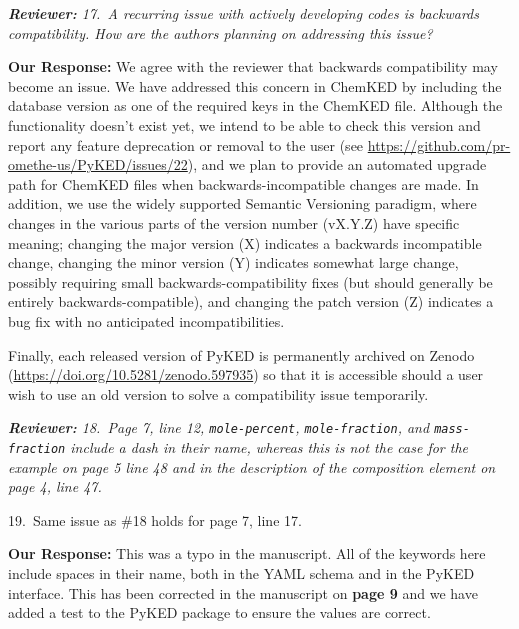 \documentclass[a4paper,10pt]{elsarticle}
\newenvironment{reviewer}{\vspace{0.5\baselineskip}\begingroup\itshape\textbf{Reviewer:}}{\endgroup}
\newenvironment{response}{\textbf{Our Response:}}{\vspace{0.5\baselineskip}}
\begin{document}
\begin{reviewer}
    17.~A recurring issue with actively developing codes is backwards compatibility. How are the
    authors planning on addressing this issue?
\end{reviewer}

\begin{response}
    We agree with the reviewer that backwards compatibility may become an issue. We have addressed
    this concern in ChemKED by including the database version as one of the required keys in the
    ChemKED file. Although the functionality doesn't exist yet, we intend to be able to check this
    version and report any feature deprecation or removal to the user (see
    \url{https://github.com/pr-omethe-us/PyKED/issues/22}), and we plan to provide an automated
    upgrade path for ChemKED files when backwards-incompatible changes are made. In addition, we use
    the widely supported Semantic Versioning paradigm, where changes in the various parts of the
    version number (vX.Y.Z) have specific meaning; changing the major version (X) indicates a
    backwards incompatible change, changing the minor version (Y) indicates somewhat large change,
    possibly requiring small backwards-compatibility fixes (but should generally be entirely
    backwards-compatible), and changing the patch version (Z) indicates a bug fix with no
    anticipated incompatibilities.

    Finally, each released version of PyKED is permanently archived on Zenodo
    (\url{https://doi.org/10.5281/zenodo.597935}) so that it is accessible should a user wish to use
    an old version to solve a compatibility issue temporarily.
\end{response}

\begin{reviewer}
    18.~Page 7, line 12, \texttt{mole-percent}, \texttt{mole-fraction}, and \texttt{mass-fraction}
    include a dash in their name, whereas this is not the case for the example on page 5 line 48 and
    in the description of the composition element on page 4, line 47.

    19.~Same issue as \#18 holds for page 7, line 17.
\end{reviewer}

\begin{response}
    This was a typo in the manuscript. All of the keywords here include spaces in their name, both
    in the YAML schema and in the PyKED interface. This has been corrected in the manuscript on
    \textbf{page 9} and we have added a test to the PyKED package to ensure the values are correct.
\end{response}
\end{document}
